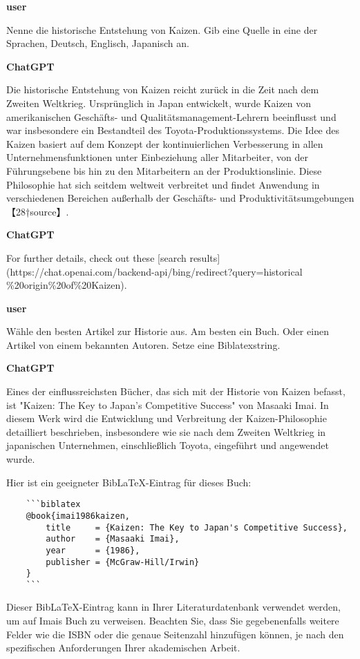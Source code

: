 \textbf{user}

Nenne die historische Entstehung von Kaizen. Gib eine Quelle in eine der Sprachen, Deutsch, Englisch, Japanisch an.

\textbf{ChatGPT}

Die historische Entstehung von Kaizen reicht zurück in die Zeit nach dem Zweiten Weltkrieg. Ursprünglich in Japan entwickelt, wurde Kaizen von amerikanischen Geschäfts- und Qualitätsmanagement-Lehrern beeinflusst und war insbesondere ein Bestandteil des Toyota-Produktionssystems. Die Idee des Kaizen basiert auf dem Konzept der kontinuierlichen Verbesserung in allen Unternehmensfunktionen unter Einbeziehung aller Mitarbeiter, von der Führungsebene bis hin zu den Mitarbeitern an der Produktionslinie. Diese Philosophie hat sich seitdem weltweit verbreitet und findet Anwendung in verschiedenen Bereichen außerhalb der Geschäfts- und Produktivitätsumgebungen【28†source】.

\textbf{ChatGPT}

For further details, check out these [search results](https://chat.openai.com/backend-api/bing/redirect?query=historical
\%20origin\%20of\%20Kaizen).

\textbf{user}

Wähle den besten Artikel zur Historie aus. Am besten ein Buch. Oder einen Artikel von einem bekannten Autoren. Setze eine Biblatexstring.

\textbf{ChatGPT}

Eines der einflussreichsten Bücher, das sich mit der Historie von Kaizen befasst, ist "Kaizen: The Key to Japan's Competitive Success" von Masaaki Imai. In diesem Werk wird die Entwicklung und Verbreitung der Kaizen-Philosophie detailliert beschrieben, insbesondere wie sie nach dem Zweiten Weltkrieg in japanischen Unternehmen, einschließlich Toyota, eingeführt und angewendet wurde.

Hier ist ein geeigneter BibLaTeX-Eintrag für dieses Buch:

\begin{verbatim}
	```biblatex
	@book{imai1986kaizen,
		title     = {Kaizen: The Key to Japan's Competitive Success},
		author    = {Masaaki Imai},
		year      = {1986},
		publisher = {McGraw-Hill/Irwin}
	}
	```
\end{verbatim}

Dieser BibLaTeX-Eintrag kann in Ihrer Literaturdatenbank verwendet werden, um auf Imais Buch zu verweisen. Beachten Sie, dass Sie gegebenenfalls weitere Felder wie die ISBN oder die genaue Seitenzahl hinzufügen können, je nach den spezifischen Anforderungen Ihrer akademischen Arbeit.

